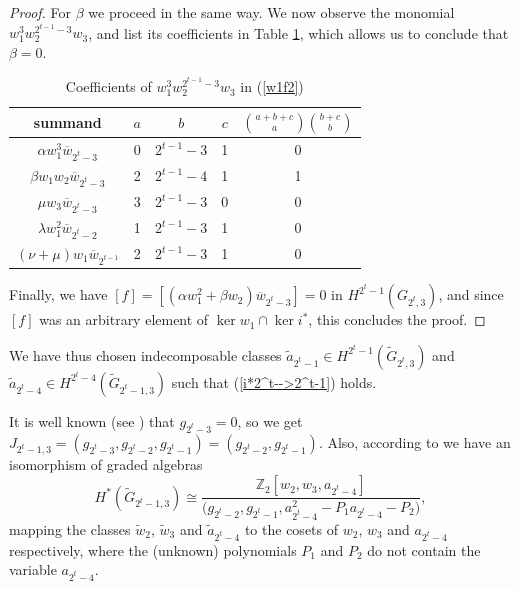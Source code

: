 \documentclass{amsart}
\theoremstyle{definition}
\theoremstyle{remark}
\numberwithin{equation}{section}
\begin{document}
\begin{proof}
For $\beta$ we proceed in the same way. We now observe the monomial $w_1^3w_2^{2^{t-1}-3}w_3$, and list its coefficients in Table \ref{tab:beta}, which allows us to conclude that $\beta =0$.
\begin{table}[h]
\renewcommand{\arraystretch}{1.5} %
\begin{tabular}{|c|c|c|c|c|}
 \hline
summand & $a$ & $b$ & $c$ &  $\binom{a+b+c}{a}\binom{b+c}{b}$ \\ [1ex]
 \hline
$\alpha w_1^3\overline w_{2^t-3}$ & 0 & $2^{t-1}-3$ & 1 &   0\\ 
$\beta w_1w_2\overline w_{2^t-3}$ & 2 & $2^{t-1}-4$ & 1 &   1\\
$\mu w_3\overline w_{2^t-3}$ & 3 & $2^{t-1}-3$ & 0 &   0\\
$\lambda w_1^2 \overline w_{2^t-2}$ & 1 & $2^{t-1}-3$ & 1 &   0\\
$(\nu + \mu)w_1\overline w_{2^{t-1}}$ & 2 & $2^{t-1}-3$ & 1 &   0\\
 \hline
  \end{tabular}
\caption{\label{tab:beta} Coefficients of $w_1^3w_2^{2^{t-1}-3}w_3$ in (\ref{w1f2})}
\end{table}

 Finally, we have $[f] = [(\alpha w_1^2 + \beta w_2)\overline w_{2^t-3}] = 0$ in $H^{2^t-1}(G_{2^t,3})$, and since $[f]$ was an arbitrary element of $\ker w_1\cap \ker i^*$, this concludes the proof.
\end{proof}

We have thus chosen indecomposable classes $\widetilde a_{2^t-1}\in H^{2^t-1}(\widetilde G_{2^t,3})$ and $\widetilde a_{2^t-4}\in H^{2^t-4}(\widetilde G_{2^t-1,3})$ such that (\ref{i*2^t-->2^t-1}) holds.

It is well known (see \cite[Lemma 2.1(i)]{BasuChakraborty}) that $g_{2^t-3}=0$, so we get $J_{2^t-1,3}=(g_{2^t-3},g_{2^t-2},g_{2^t-1})=(g_{2^t-2},g_{2^t-1})$. Also, according to \cite[Theorem B(2)]{BasuChakraborty} we have an isomorphism of graded algebras
\begin{equation}\label{isomorphism2^t-1}
 H^*(\widetilde G_{2^t-1,3})\cong\frac{\mathbb Z_2[w_2,w_3,a_{2^t-4}]}{\big(g_{2^t-2},g_{2^t-1},a_{2^t-4}^2-P_1a_{2^t-4}-P_2\big)},  
 \end{equation}
 mapping the classes $\widetilde w_2$, $\widetilde w_3$ and $\widetilde a_{2^t-4}$ to the cosets of $w_2$, $w_3$ and $a_{2^t-4}$ respectively, where the (unknown) polynomials $P_1$ and $P_2$ do not contain the variable $a_{2^t-4}$. 
\end{document}

